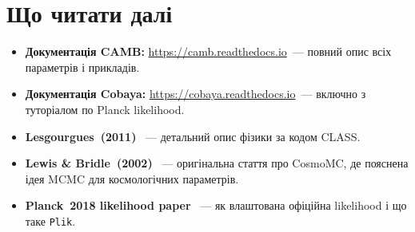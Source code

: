 \section{Що читати далі}

\begin{itemize}
  \item \textbf{Документація CAMB:}
        \url{https://camb.readthedocs.io}~--- повний опис
        всіх параметрів і прикладів.
  \item \textbf{Документація Cobaya:}
        \url{https://cobaya.readthedocs.io}~--- включно з
        туторіалом по Planck likelihood.
  \item \textbf{Lesgourgues~(2011)} \cite{lesgourgues_2011}~---
        детальний опис фізики за кодом CLASS.
  \item \textbf{Lewis \& Bridle~(2002)} \cite{lewis_2002}~---
        оригінальна стаття про CosmoMC, де пояснена ідея
        MCMC для космологічних параметрів.
  \item \textbf{Planck~2018 likelihood paper}
        \cite{planck_2018_like}~--- як влаштована офіційна
        likelihood і що таке \texttt{Plik}.
\end{itemize}